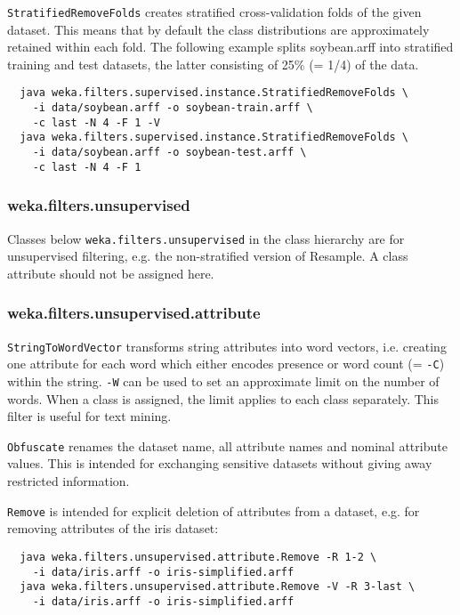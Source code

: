 \noindent \texttt{StratifiedRemoveFolds} creates stratified cross-validation folds of the given dataset. This means that by default the class distributions are approximately retained within each fold. The following example splits soybean.arff into stratified training and test datasets, the latter consisting of 25\% (= 1/4) of the data.

{\scriptsize
\begin{verbatim}
  java weka.filters.supervised.instance.StratifiedRemoveFolds \
    -i data/soybean.arff -o soybean-train.arff \
    -c last -N 4 -F 1 -V
  java weka.filters.supervised.instance.StratifiedRemoveFolds \
    -i data/soybean.arff -o soybean-test.arff \
    -c last -N 4 -F 1
\end{verbatim}}

\subsubsection*{weka.filters.unsupervised}

Classes below \texttt{weka.filters.unsupervised} in the class hierarchy are for unsupervised filtering, e.g. the non-stratified version of Resample. A class attribute should not be assigned here.

\subsubsection*{weka.filters.unsupervised.attribute}

\texttt{StringToWordVector} transforms string attributes into word vectors, i.e. creating one attribute for each word which either encodes presence or word count (= \texttt{-C}) within the string. \texttt{-W} can be used to set an approximate limit on the number of words. When a class is assigned, the limit applies to each class separately. This filter is useful for text mining.

\noindent \texttt{Obfuscate} renames the dataset name, all attribute names and nominal attribute values. This is intended for exchanging sensitive datasets without giving away restricted information.

\noindent \texttt{Remove} is intended for explicit deletion of attributes from a dataset, e.g. for removing attributes of the iris dataset:

{\scriptsize
\begin{verbatim}
  java weka.filters.unsupervised.attribute.Remove -R 1-2 \
    -i data/iris.arff -o iris-simplified.arff
  java weka.filters.unsupervised.attribute.Remove -V -R 3-last \
    -i data/iris.arff -o iris-simplified.arff
\end{verbatim}}

